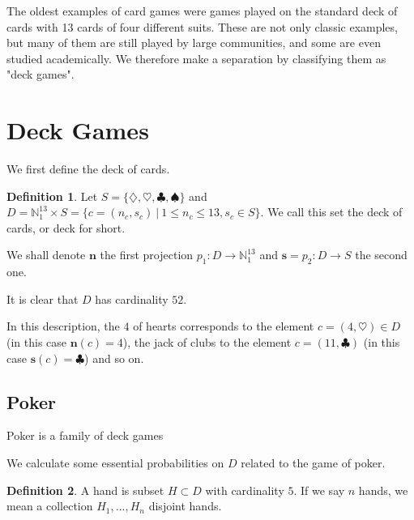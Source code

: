 \documentclass[]{article}
\theoremstyle{definition}
\newtheorem{definition}{Definition}[section]
\theoremstyle{definition}
\newcommand{\raw}{\rightarrow}
\newcommand{\bb}{\mathbb}
\begin{document}
	The oldest examples of card games were games played on the standard deck of cards with 13 cards of four different suits. These are not only classic examples, but many of them are still played by large communities, and some are even studied academically. We therefore make a separation by classifying them as "deck games".
	
	\section{Deck Games}
	
	We first define the deck of cards. 
	
	\begin{definition}
		
		Let $S = \{ \diamondsuit, \heartsuit, \clubsuit, \spadesuit \}$ and $D = \bb{N}_1^{13} \times S = \{ c = (n_c, s_c)\ | \ 1 \leq n_c \leq 13, s_c \in S \}$. We call this set the deck of cards, or deck for short. 
		
		We shall denote $\textbf{n}$ the first projection $p_1: D \raw \bb{N}_1^{13}$ and $\textbf{s} = p_2: D \raw S$ the second one. 
		
	\end{definition}
	
	It is clear that $D$ has cardinality $52$.
	
	In this description, the $4$ of hearts corresponds to the element $c = (4, \heartsuit) \in D$ (in this case $\textbf{n}(c) = 4$), the jack of clubs to the element $c = (11, \clubsuit)$ (in this case $\textbf{s}(c) = \clubsuit$) and so on. 
	
	\subsection{Poker}
	
	Poker is a family of deck games
	
	We calculate some essential probabilities on $D$ related to the game of poker. 
	
	\begin{definition}
		A hand is subset $H \subset D$ with cardinality $5$. If we say $n$ hands, we mean a collection $H_1, ..., H_n$ disjoint hands.
	\end{definition}
	
\end{document}
